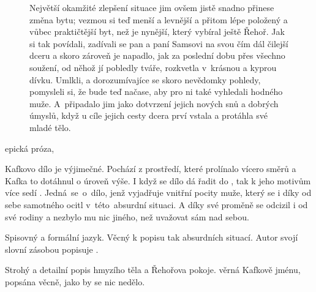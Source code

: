 \documentclass[FGBook.tex]{subfiles}
\begin{document}

\noindent\begin{figure}\footnotesize
{}
\setlength{\parindent}{3pt}
Největší okamžité zlepšení situace jim ovšem jistě snadno přinese změna bytu;
vezmou si teď menší a levnější a přitom lépe položený a vůbec praktičtější byt,
než je nynější, který vybíral ještě Řehoř.
Jak si tak povídali, zadívali se pan a paní Samsovi na svou čím dál čilejší dceru
a skoro zároveň je napadlo, jak za poslední dobu přes všechno soužení,
od něhož jí pobledly tváře, rozkvetla v~krásnou a kyprou dívku.
Umlkli, a dorozumívajíce se skoro nevědomky pohledy, pomysleli si,
že bude teď načase, aby pro ni také vyhledali hodného muže.
A~připadalo jim jako dotvrzení jejich nových snů a dobrých úmyslů,
když u cíle jejich cesty dcera prví vstala a protáhla své mladé tělo.
\end{figure}


\noindent epická próza, 

\noindent Kafkovo dílo je výjimečné.
Pochází z prostředí, které prolínalo vícero směrů a Kafka to dotáhnul o úroveň výše.
I když se dílo dá řadit do , tak k jeho motivům více sedí .
Jedná~se~o~dílo, jenž vyjadřuje vnitřní pocity muže,
který se i díky  od sebe samotného ocitl v~této~absurdní situaci.
A díky své proměně se odcizil i od své rodiny a nezbylo mu nic jiného, než uvažovat sám nad sebou.

\noindent Spisovný a formální jazyk.
Věcný k popisu tak absurdních situací.
Autor svojí slovní zásobou popisuje .



\noindent Strohý a detailní popis hmyzího těla a Řehořova pokoje.
 věrná Kafkově jménu, popsána věcně, jako by se nic nedělo.
\end{document}
